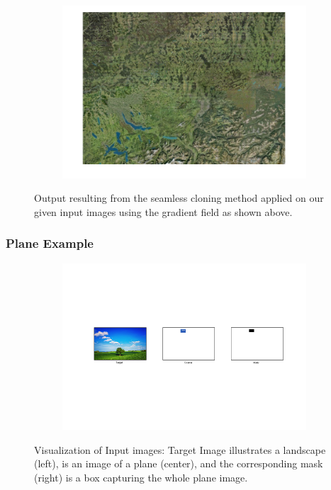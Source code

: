 \documentclass{paper}
\begin{document}
\begin{figure}[H]
    \centering
    \begin{subfigure}{1.0\textwidth}
        \includegraphics[width=\textwidth]{../../outputs/p4/seamless_cloning/map/output}
    \end{subfigure}
    \caption{Output resulting from the seamless cloning method applied on our given input images using the gradient field as shown above.}
    \label{fig:seamless_cloning_map_out}       
\end{figure}

\subsubsection{Plane Example}
\begin{figure}[H]
    \centering
    \begin{subfigure}{1.0\textwidth}
        \includegraphics[width=\textwidth]{../../outputs/p4/seamless_cloning/plane/input}
    \end{subfigure}
    \caption{Visualization of Input images: Target Image illustrates a landscape (left), is an image of a plane (center), and the corresponding mask (right) is a box capturing the whole plane image.}
    \label{fig:seamless_cloning_plane_input}       
\end{figure}
\end{document}
